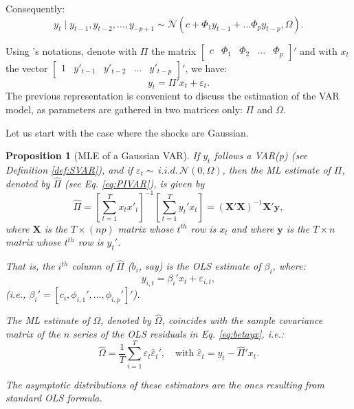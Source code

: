 \documentclass[
]{book}
\newtheorem{proposition}{Proposition}[chapter]
\theoremstyle{definition}
\theoremstyle{definition}
\theoremstyle{definition}
\theoremstyle{definition}
\theoremstyle{remark}
\begin{document}
Consequently:
\[
y_{t}\mid y_{t-1},y_{t-2},\ldots,y_{-p+1}\sim \mathcal{N}(c+\Phi_{1}y_{t-1}+\ldots\Phi_{p}y_{t-p},\Omega).
\]

Using \citet{Hamilton_1994}'s notations, denote with \(\Pi\) the matrix \(\left[\begin{array}{ccccc} c & \Phi_{1} & \Phi_{2} & \ldots & \Phi_{p}\end{array}\right]'\) and with \(x_{t}\) the vector \(\left[\begin{array}{ccccc} 1 & y'_{t-1} & y'_{t-2} & \ldots & y'_{t-p}\end{array}\right]'\), we have:
\begin{equation}
y_{t}= \Pi'x_{t} + \varepsilon_{t}. \label{eq:PIVAR}
\end{equation}
The previous representation is convenient to discuss the estimation of the VAR model, as parameters are gathered in two matrices only: \(\Pi\) and \(\Omega\).

Let us start with the case where the shocks are Gaussian.

\begin{proposition}[MLE of a Gaussian VAR]
\protect\hypertarget{prp:estimVARGaussian}{}\label{prp:estimVARGaussian}If \(y_t\) follows a VAR(p) (see Definition \ref{def:SVAR}), and if \(\varepsilon_t \sim \,i.i.d.\,\mathcal{N}(0,\Omega)\), then the ML estimate of \(\Pi\), denoted by \(\hat{\Pi}\) (see Eq. \eqref{eq:PIVAR}), is given by
\begin{equation}
\hat{\Pi}=\left[\sum_{t=1}^{T}x_{t}x'_{t}\right]^{-1}\left[\sum_{t=1}^{T}y_{t}'x_{t}\right]= (\mathbf{X}'\mathbf{X})^{-1}\mathbf{X}'\mathbf{y},\label{eq:Pi}
\end{equation}
where \(\mathbf{X}\) is the \(T \times (np)\) matrix whose \(t^{th}\) row is \(x_t\) and where \(\mathbf{y}\) is the \(T \times n\) matrix whose \(t^{th}\) row is \(y_{t}'\).

That is, the \(i^{th}\) column of \(\hat{\Pi}\) (\(b_i\), say) is the OLS estimate of \(\beta_i\), where:
\begin{equation}
y_{i,t} = \beta_i'x_t + \varepsilon_{i,t},\label{eq:betayx}
\end{equation}
(i.e., \(\beta_i' = [c_i,\phi_{i,1}',\dots,\phi_{i,p}']'\)).

The ML estimate of \(\Omega\), denoted by \(\hat{\Omega}\), coincides with the sample covariance matrix of the \(n\) series of the OLS residuals in Eq. \eqref{eq:betayx}, i.e.:
\begin{equation}
\hat{\Omega} = \frac{1}{T} \sum_{i=1}^T \hat{\varepsilon}_t\hat{\varepsilon}_t',\quad\mbox{with } \hat{\varepsilon}_t= y_t - \hat{\Pi}'x_t.
\end{equation}

The asymptotic distributions of these estimators are the ones resulting from standard OLS formula.
\end{proposition}
\end{document}
